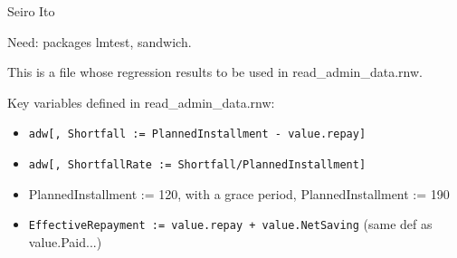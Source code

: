 \hfil Seiro Ito

\setlength{\parindent}{1em}
\vspace{2ex}

Need: packages \textsf{lmtest, sandwich}.

This is a file whose regression results to be used in read\_admin\_data.rnw.


Key variables defined in read\_admin\_data.rnw:
\begin{itemize}
\vspace{1.0ex}\setlength{\itemsep}{1.0ex}\setlength{\baselineskip}{12pt}
\item	\verb|adw[, Shortfall := PlannedInstallment - value.repay]|
\item	\verb|adw[, ShortfallRate := Shortfall/PlannedInstallment]|
\item	PlannedInstallment := 120, with a grace period, PlannedInstallment := 190
\item	\verb|EffectiveRepayment := value.repay + value.NetSaving| (same def as value.Paid...)
\end{itemize}








